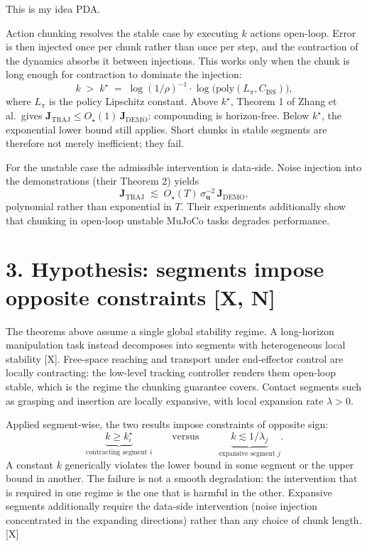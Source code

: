 This is my idea PDA. \documentclass[11pt]{article}
\newcommand{\Jtraj}{\mathbf{J}_{\mathrm{TRAJ}}}
\newcommand{\Jdemo}{\mathbf{J}_{\mathrm{DEMO}}}
\newcommand{\Ciss}{C_{\mathrm{ISS}}}
\begin{document}
Action chunking resolves the stable case by executing $k$ actions open-loop. Error is then injected once per chunk rather than once per step, and the contraction of the dynamics absorbs it between injections. This works only when the chunk is long enough for contraction to dominate the injection:
\begin{equation}
k \;>\; k^\star \;=\; \log(1/\rho)^{-1}\cdot\log\bigl(\mathrm{poly}(L_\pi,\Ciss)\bigr),
\end{equation}
where $L_\pi$ is the policy Lipschitz constant. Above $k^\star$, Theorem 1 of Zhang et al.\ gives $\Jtraj \leq O_\star(1)\,\Jdemo$: compounding is horizon-free. Below $k^\star$, the exponential lower bound still applies. Short chunks in stable segments are therefore not merely inefficient; they fail.

For the unstable case the admissible intervention is data-side. Noise injection into the demonstrations (their Theorem 2) yields
\begin{equation}
\Jtraj \;\lesssim\; O_\star(T)\,\sigma_{\mathbf{u}}^{-2}\,\Jdemo,
\end{equation}
polynomial rather than exponential in $T$. Their experiments additionally show that chunking in open-loop unstable MuJoCo tasks degrades performance.

\section*{3. Hypothesis: segments impose opposite constraints [X, N]}

The theorems above assume a single global stability regime. A long-horizon manipulation task instead decomposes into segments with heterogeneous local stability [X]. Free-space reaching and transport under end-effector control are locally contracting: the low-level tracking controller renders them open-loop stable, which is the regime the chunking guarantee covers. Contact segments such as grasping and insertion are locally expansive, with local expansion rate $\lambda > 0$.

Applied segment-wise, the two results impose constraints of opposite sign:
\begin{equation}
\underbrace{k \geq k^\star_i}_{\text{contracting segment } i} \qquad \text{versus} \qquad \underbrace{k \lesssim 1/\lambda_j}_{\text{expansive segment } j}.
\end{equation}
A constant $k$ generically violates the lower bound in some segment or the upper bound in another. The failure is not a smooth degradation: the intervention that is required in one regime is the one that is harmful in the other. Expansive segments additionally require the data-side intervention (noise injection concentrated in the expanding directions) rather than any choice of chunk length. [X]
\end{document}
